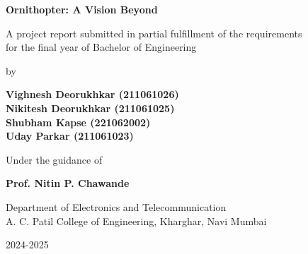 \begin{titlepage}
    \centering
    \vspace*{2cm}
    {\Huge\bfseries Ornithopter: A Vision Beyond\par}
    \vspace{1.5cm}
    
    \large{A project report submitted in partial fulfillment of the requirements\\ for the final year of Bachelor of Engineering}
    \vspace{2cm}
    
    \large{by}
    \vspace{0.5cm}
    
    \large{\textbf{Vighnesh Deorukhkar (211061026)}\\
    \textbf{Nikitesh Deorukhkar (211061025)}\\
    \textbf{Shubham Kapse (221062002)}\\
    \textbf{Uday Parkar (211061023)}}
    \vspace{2cm}
    
    \large{Under the guidance of}
    \vspace{0.5cm}
    
    \large{\textbf{Prof. Nitin P. Chawande}}
    \vspace{1cm}
    
    \large{Department of Electronics and Telecommunication\\
    A. C. Patil College of Engineering, Kharghar, Navi Mumbai}
    \vspace{1cm}
    
    \large{2024-2025}
    \vfill
\end{titlepage}